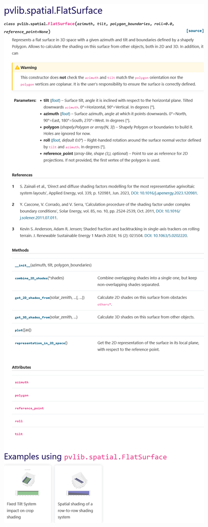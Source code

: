 \begin{myparindent}{0pt}
\includegraphics[width=\linewidth,height=0.9\textheight,keepaspectratio]{images/docs_funcs/pvlib.spatial.FlatSurface.png}


\end{myparindent}
